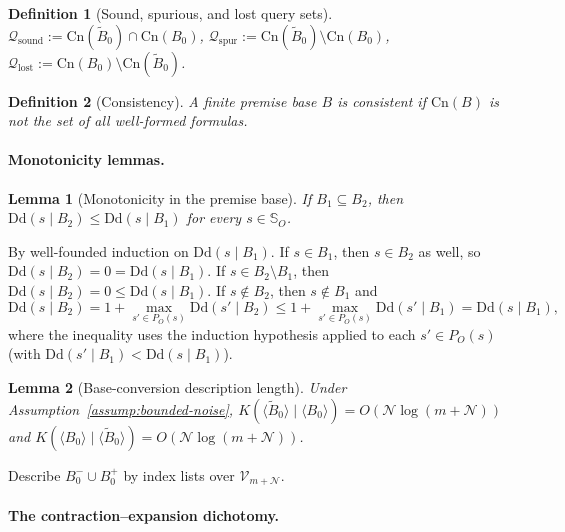 \documentclass[journal]{IEEEtran}
\makeatletter
\newcommand{\Dd}{\text{Dd}}
\newcommand{\Cn}{\text{Cn}}
\newtheorem{lemma}{Lemma}[section]
\newtheorem{definition}{Definition}[section]
\numberwithin{equation}{section}
\renewenvironment{proof}[1][\proofname]{\par
  \pushQED{\qed}%
  \normalfont \topsep6\p@\@plus6\p@\relax
  \trivlist
  \item[\hskip\labelsep
        \itshape
    #1\@addpunct{.}]\ignorespaces
}{%
  \popQED\endtrivlist\@endpefalse
}
\makeatother
\begin{document}
\begin{definition}[Sound, spurious, and lost query sets]
\label{def:query-partition}
$\mathcal{Q}_{\mathrm{sound}}
 :=\Cn(\tilde B_0)\cap\Cn(B_0)$,\;
$\mathcal{Q}_{\mathrm{spur}}
 :=\Cn(\tilde B_0)\setminus\Cn(B_0)$,\;
$\mathcal{Q}_{\mathrm{lost}}
 :=\Cn(B_0)\setminus\Cn(\tilde B_0)$.
\end{definition}

\begin{definition}[Consistency]
\label{def:consistency-class}
A finite premise base $B$ is \emph{consistent} if
$\Cn(B)$ is not the set of all well-formed formulas.
\end{definition}

\paragraph{Monotonicity lemmas.}

\begin{lemma}[Monotonicity in the premise base]
\label{lem:premise-monotonicity-sec3}
If $B_1\subseteq B_2$, then $\Dd(s\mid B_2)\le\Dd(s\mid B_1)$
for every $s\in\mathbb S_O$.
\end{lemma}

\begin{proof}
By well-founded induction on $\Dd(s\mid B_1)$.
If $s\in B_1$, then $s\in B_2$ as well, so
$\Dd(s\mid B_2)=0=\Dd(s\mid B_1)$.
If $s\in B_2\setminus B_1$, then
$\Dd(s\mid B_2)=0\le\Dd(s\mid B_1)$.
If $s\notin B_2$, then $s\notin B_1$ and
\[
  \Dd(s\mid B_2)
  =1+\max_{s'\in P_O(s)}\Dd(s'\mid B_2)
  \le 1+\max_{s'\in P_O(s)}\Dd(s'\mid B_1)
  =\Dd(s\mid B_1),
\]
where the inequality uses the induction hypothesis applied to
each $s'\in P_O(s)$ (with $\Dd(s'\mid B_1)<\Dd(s\mid B_1)$).
\end{proof}

\begin{lemma}[Base-conversion description length]
\label{lem:base-conversion}
Under Assumption~\ref{assump:bounded-noise},
$K(\langle\tilde B_0\rangle\mid\langle B_0\rangle)
=O(\mathcal N\log(m+\mathcal N))$
and
$K(\langle B_0\rangle\mid\langle\tilde B_0\rangle)
=O(\mathcal N\log(m+\mathcal N))$.
\end{lemma}

\begin{proof}
Describe $B_0^-\cup B_0^+$ by index lists over
$\mathcal V_{m+\mathcal N}$.
\end{proof}

\paragraph{The contraction--expansion dichotomy.}
\end{document}
